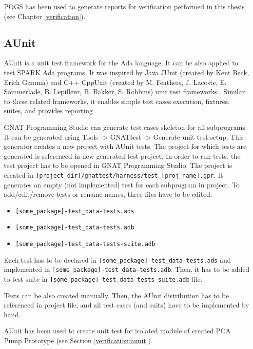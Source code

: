 POGS has been used to generate reports for verification performed in this thesis (see Chapter \ref{verification}). 



\subsection{AUnit}
\label{background:sparkverification:aunit}

AUnit is a unit test framework for the Ada language. It can be also applied to test SPARK Ada programs. It was inspired by Java JUnit (created by Kent Beck, Erich Gamma) and C++ CppUnit (created by M. Feathers, J. Lacoste, E. Sommerlade, B. Lepilleur, B. Bakker, S. Robbins) unit test frameworks \cite{AUnitCookbook:Online}. Similar to these related frameworks, it enables simple test cases execution, fixtures, suites, and provides reporting \cite{AUnitTutorials:Online}. 

GNAT Programming Studio can generate test cases skeleton for all subprograms. It can be generated using Tools -> GNATtest -> Generate unit test setup. This generator creates a new project with AUnit tests. The project for which tests are generated is referenced in new generated test project. In order to run tests, the test project has to be opened in GNAT Programming Studio. The project is created in \lstinline{[project_dir]/gnattest/harness/test_[proj_name].gpr}. It generates an empty (not implemented) test for each subprogram in project. To add/edit/remove tests or rename names, three files have to be edited:

\begin{itemize}
    \item \lstinline{[some_package]-test_data-tests.ads}
    \item \lstinline{[some_package]-test_data-tests.adb}
    \item \lstinline{[some_package]-test_data-tests-suite.adb}
\end{itemize}

Each test has to be declared in \lstinline{[some_package]-test_data-tests.ads} and implemented in \lstinline{[some_package]-test_data-tests.adb}. Then, it has to be added to test suite in \lstinline{[some_package]-test_data-tests-suite.adb} file.

Tests can be also created manually. Then, the AUnit distribution has to be referenced in project file, and all test cases (and suits) have to be implemented by hand.

AUnit has been used to create unit test for isolated module of created PCA Pump Prototype (see Section \ref{verification:aunit}).



